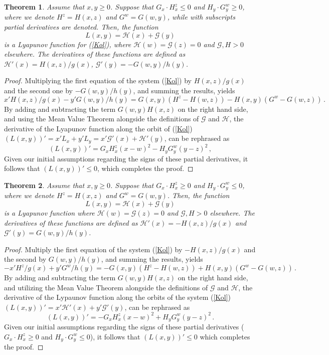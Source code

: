 \documentclass[reqno,10pt]{article}
\newtheorem{theorem}{Theorem}
\theoremstyle{definition}
\numberwithin{equation}{section}
\numberwithin{theorem}{section}
\begin{document}
\begin{theorem} \label{MyThmLabel} %
Assume that $x,y \ge 0$. Suppose that $G_x\cdot H_x^z \le 0$ and $H_y\cdot G_y^w\ge 0$, where we denote  $H^z=H(x,z)$ and $G^w=G(w,y)$, while with subscripts partial derivatives are denoted. Then, the function
\[L(x,y)={\mathcal H}(x)+{\mathcal G}(y)\] 
is a Lyapunov function for (\ref{Kol}), where ${\mathcal H}(w)={\mathcal G}(z)=0$ and ${\mathcal G, H}>0$ elsewhere. The derivatives of these functions are defined as ${\mathcal H}'(x)=H(x,z)/g(x)$, ${\mathcal G}'(y)=-G(w,y)/h(y)$. 
\end{theorem}
\begin{proof}
Multiplying the first equation of the system (\ref{Kol}) by $H(x,z)/g(x)$ and the second one by $-G(w,y)/h(y)$, and summing the results, yields
\[
x'H(x,z)/g(x)-y'G(w,y)/h(y)=G(x,y)(H^z-H(w,z))-H(x,y)(G^w-G(w,z))\,.
\]
By adding and subtracting the term $G(w,y)H(x,z)$ on the right hand side, and using the Mean Value Theorem alongside the definitions of ${\mathcal G}$ and ${\mathcal H}$, the derivative of the Lyapunov function along the orbit of (\ref{Kol}) $(L(x,y))'=x'L_x+y'L_y=x'{\mathcal G}'(x)+{\mathcal H}'(y)$, can be rephrased as
\[
(L(x,y))'=G_xH_x^z(x-w)^2-H_yG_y^w(y-z)^2\,,
\]
Given our initial assumptions regarding the signs of these partial derivatives, it follows that $(L(x,y))'\le 0$, which completes the proof.
\end{proof}

\begin{theorem} \label{MyThm} %
Assume that $x,y \ge 0$. Suppose that $G_x\cdot H_x^z \ge 0$ and $H_y\cdot G_y^w\le 0$, where we denote  $H^z=H(x,z)$ and $G^w=G(w,y)$. Then, the function
\[L(x,y)={\mathcal H}(x)+{\mathcal G}(y)\] 
 is a Lyapunov function 
where  ${\mathcal H}(w)={\mathcal G}(z)=0$ and ${\mathcal G, H}>0$ elsewhere. The derivatives of these functions are defined as ${\mathcal H}'(x)=-H(x,z)/g(x)$ and ${\mathcal G}'(y)=G(w,y)/h(y)$. 
\end{theorem}
\begin{proof}
Multiply the first equation of the system (\ref{Kol}) by $-H(x,z)/g(x)$ and the second by $G(w,y)/h(y)$, and summing the results, yields
\[
-x'H^z/g(x)+y'G^w/h(y)=-G(x,y)(H^z-H(w,z))+H(x,y)(G^w-G(w,z))\,.
\]
By adding and subtracting the term $G(w,y)H(x,z)$ on the right hand side, and utilizing the Mean Value Theorem alongside the definitions of ${\mathcal G}$ and ${\mathcal H}$, the derivative of the Lypaunov function along the orbits of the system (\ref{Kol}) $(L(x,y))'=x'{\mathcal H}'(x)+y'{\mathcal G}'(y)$, can be rephrased as 
\[
(L(x,y))'=-G_xH_x^z(x-w)^2+H_yG_y^w(y-z)^2\,.
\]
Given our initial assumptions regarding the signs of these partial derivatives ($G_x\cdot H_x^z \ge 0$ and $H_y\cdot G_y^w\le 0$), it follows that $(L(x,y))'\le 0$ which completes the proof.
\end{proof}
\end{document}
